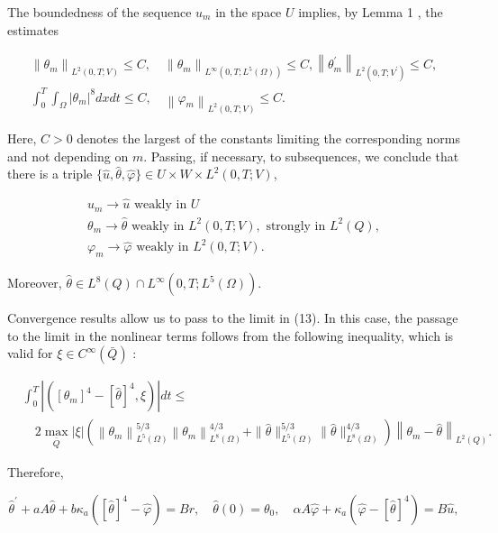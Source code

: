 The boundedness of the sequence $u_{m}$ in the space $U$ implies, by Lemma 1 , the estimates

$$
\begin{gathered}
\left\|\theta_{m}\right\|_{L^{2}(0, T ; V)} \leq C, \quad\left\|\theta_{m}\right\|_{L^{\infty}\left(0, T ; L^{5}(\Omega)\right)} \leq C,\left\|\theta_{m}^{\prime}\right\|_{L^{2}\left(0, T ; V^{\prime}\right)} \leq C, \\
\int_{0}^{T} \int_{\Omega}\left|\theta_{m}\right|^{8} d x d t \leq C, \quad\left\|\varphi_{m}\right\|_{L^{2}(0, T ; V)} \leq C .
\end{gathered}
$$

Here, $C>0$ denotes the largest of the constants limiting the corresponding norms and not depending on $m$. Passing, if necessary, to subsequences, we conclude that there is a triple $\{\widehat{u}, \widehat{\theta}, \widehat{\varphi}\} \in U \times W \times L^{2}(0, T ; V)$,

$$
\begin{gathered}
u_{m} \rightarrow \widehat{u} \text { weakly in } U \\
\theta_{m} \rightarrow \widehat{\theta} \text { weakly in } L^{2}(0, T ; V), \text { strongly in } L^{2}(Q), \\
\varphi_{m} \rightarrow \widehat{\varphi} \text { weakly in } L^{2}(0, T ; V) .
\end{gathered}
$$

Moreover, $\widehat{\theta} \in L^{8}(Q) \cap L^{\infty}\left(0, T ; L^{5}(\Omega)\right)$.

Convergence results allow us to pass to the limit in (13). In this case, the passage to the limit in the nonlinear terms follows from the following inequality, which is valid for $\xi \in C^{\infty}(\bar{Q})$ :

$$
\begin{aligned}
& \int_{0}^{T}\left|\left(\left[\theta_{m}\right]^{4}-[\widehat{\theta}]^{4}, \xi\right)\right| d t \leq \\
& \quad 2 \max _{\bar{Q}}|\xi|\left(\left\|\theta_{m}\right\|_{L^{5}(\Omega)}^{5 / 3}\left\|\theta_{m}\right\|_{L^{8}(\Omega)}^{4 / 3}+\|\widehat{\theta}\|_{L^{5}(\Omega)}^{5 / 3}\|\widehat{\theta}\|_{L^{8}(\Omega)}^{4 / 3}\right)\left\|\theta_{m}-\widehat{\theta}\right\|_{L^{2}(Q)} .
\end{aligned}
$$

Therefore,

$$
\widehat{\theta}^{\prime}+a A \widehat{\theta}+b \kappa_{a}\left([\widehat{\theta}]^{4}-\widehat{\varphi}\right)=B r, \quad \widehat{\theta}(0)=\theta_{0}, \quad \alpha A \widehat{\varphi}+\kappa_{a}\left(\widehat{\varphi}-[\widehat{\theta}]^{4}\right)=B \widehat{u},
$$

